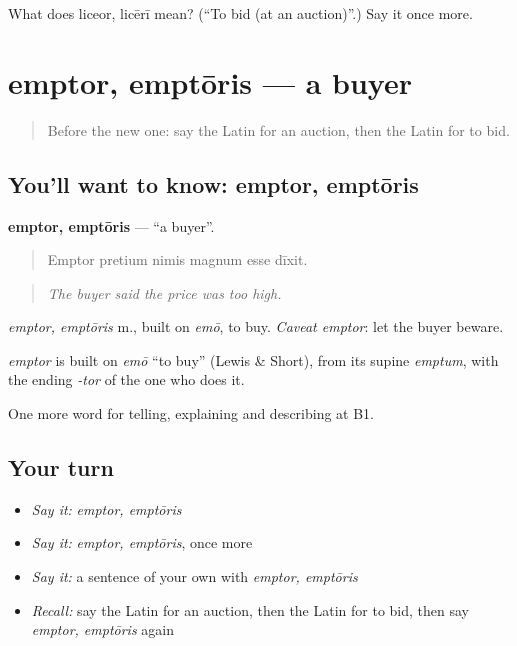 \begin{tcolorbox}[breakable,colback=teal!4,colframe=teal!35!black,title={Before you move on}]
What does liceor, licērī mean? (\textquotedblleft{}To bid (at an auction)\textquotedblright{}.) Say it once more.
\end{tcolorbox}
\section[emptor, emptōris]{emptor, emptōris — a buyer}

\label{lesson:LA-C420-emptor}



\begin{quote}
Before the new one: say the Latin for an auction, then the Latin for to bid.
\end{quote}

\subsection*{You'll want to know: emptor, emptōris}
\textbf{emptor, emptōris} — \textquotedblleft{}a buyer\textquotedblright{}.

\begin{quote}
Emptor pretium nimis magnum esse dīxit.
\end{quote}

\begin{quote}
\emph{The buyer said the price was too high.}
\end{quote}

\emph{emptor, emptōris} m., built on \emph{emō}, to buy. \emph{Caveat emptor}: let the buyer beware.

\begin{cousinweb}
\emph{emptor} is built on \emph{emō} \textquotedblleft{}to buy\textquotedblright{} (Lewis \& Short), from its supine \emph{emptum}, with the ending \emph{-tor} of the one who does it.
\end{cousinweb}

\begin{grammarlens}[title={What you've built}]
One more word for telling, explaining and describing at B1.
\end{grammarlens}

\subsection*{Your turn}
\begin{itemize}
\raggedright
  \item \emph{Say it:} \emph{emptor, emptōris}
  \item \emph{Say it:} \emph{emptor, emptōris}, once more
  \item \emph{Say it:} a sentence of your own with \emph{emptor, emptōris}
  \item \emph{Recall:} say the Latin for an auction, then the Latin for to bid, then say \emph{emptor, emptōris} again
\end{itemize}

